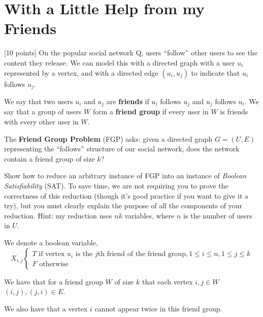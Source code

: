 \section{With a Little Help from my Friends}

 [10 points] On the popular social network Q, users ``follow'' other users to see the content they release. We can model this with a directed graph with a user $u_i$ represented by a vertex, and with a directed edge $(u_i, u_j)$ to indicate that $u_i$ follows $u_j$.

We say that two users $u_i$ and $u_j$ are \textbf{friends} if $u_i$ follows $u_j$ and $u_j$ follows $u_i$. We say that a group of users $W$ form a \textbf{friend group} if every user in $W$ is friends with every other user in $W$.

The \textbf{Friend Group Problem} (FGP) asks: given a directed graph $G = (U,E)$ representing the ``follows'' structure of our social network, does the network contain a friend group of size $k$?

Show how  to reduce an arbitrary  instance of FGP
into  an instance  of  \emph {Boolean  Satisfiability}  (SAT). To save time, we are not requiring you to prove the correctness of this reduction (though it's good practice if you want to give it a try), but you must clearly explain the purpose of all the components of your reduction. Hint:  my reduction uses $nk$ variables, where $n$ is the number of users in $U$.

\begin{soln}

	We denote a boolean variable,
	\[
		X_{i, j}
		\begin{cases}
			T \text{ if vertex \(u_i\) is the \(j\)th friend of the friend group}, 1 \leq i \leq n, 1 \leq j \leq k \\
			F \text{ otherwise }
		\end{cases}
	\]

	We have that for a friend group \(W\) of size \(k\) that each vertex \(i, j \in W\) \((i, j), (j, i) \in E\).

	We also have that a vertex \(i\) cannot appear twice in this friend group.


\end{soln}

\ifsolutions\fi
